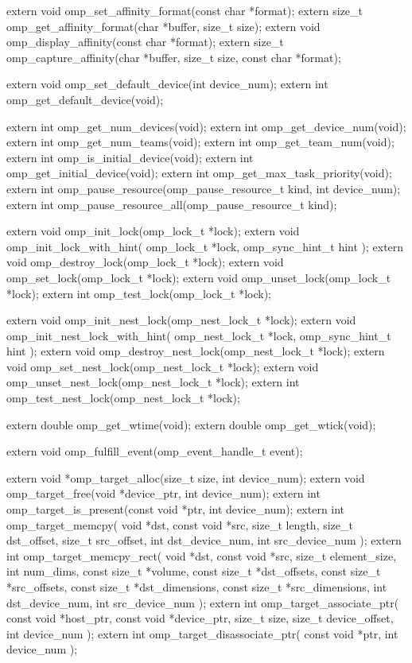 {\begin{ompcFunction}
{extern void omp_set_affinity_format(const char *format);
extern size_t omp_get_affinity_format(char *buffer, size_t size);
extern void omp_display_affinity(const char *format);
extern size_t omp_capture_affinity(char *buffer, size_t size, const char *format);

extern void omp_set_default_device(int device_num);
extern int omp_get_default_device(void);

extern int omp_get_num_devices(void);
extern int omp_get_device_num(void);
extern int omp_get_num_teams(void);
extern int omp_get_team_num(void);
extern int omp_is_initial_device(void);
extern int omp_get_initial_device(void);
extern int omp_get_max_task_priority(void);
extern int omp_pause_resource(omp_pause_resource_t kind, int device_num);
extern int omp_pause_resource_all(omp_pause_resource_t kind);

extern void omp_init_lock(omp_lock_t *lock);
extern void omp_init_lock_with_hint(
  omp_lock_t *lock,
  omp_sync_hint_t hint
);
extern void omp_destroy_lock(omp_lock_t *lock);
extern void omp_set_lock(omp_lock_t *lock);
extern void omp_unset_lock(omp_lock_t *lock);
extern int omp_test_lock(omp_lock_t *lock);

extern void omp_init_nest_lock(omp_nest_lock_t *lock);
extern void omp_init_nest_lock_with_hint(
  omp_nest_lock_t *lock,
  omp_sync_hint_t hint
);
extern void omp_destroy_nest_lock(omp_nest_lock_t *lock);
extern void omp_set_nest_lock(omp_nest_lock_t *lock);
extern void omp_unset_nest_lock(omp_nest_lock_t *lock);
extern int omp_test_nest_lock(omp_nest_lock_t *lock);

extern double omp_get_wtime(void);
extern double omp_get_wtick(void);

extern void omp_fulfill_event(omp_event_handle_t event);

extern void *omp_target_alloc(size_t size, int device_num);
extern void omp_target_free(void *device_ptr, int device_num);
extern int omp_target_is_present(const void *ptr, int device_num);
extern int omp_target_memcpy(
  void *dst,
  const void *src,
  size_t length,
  size_t dst_offset,
  size_t src_offset,
  int dst_device_num,
  int src_device_num
);
extern int omp_target_memcpy_rect(
  void *dst,
  const void *src,
  size_t element_size,
  int num_dims,
  const size_t *volume,
  const size_t *dst_offsets,
  const size_t *src_offsets,
  const size_t *dst_dimensions,
  const size_t *src_dimensions,
  int dst_device_num,
  int src_device_num
);
extern int omp_target_associate_ptr(
  const void *host_ptr,
  const void *device_ptr,
  size_t size,
  size_t device_offset,
  int device_num
);
extern int omp_target_disassociate_ptr(
  const void *ptr,
  int device_num
);

}
\end{ompcFunction}}
